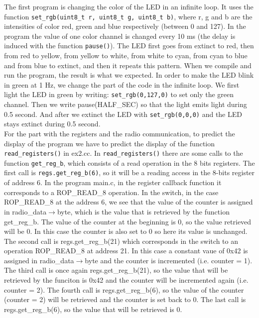 \documentclass[11pt]{article}
\begin{document}
The first program is changing the color of the LED in an infinite loop. It uses the function \texttt{set\_rgb(uint8\_t r, uint8\_t g, uint8\_t b)}, where r, g and b are the intensities of color red, green and blue respectively (between 0 and 127). In the program the value of one color channel is changed every 10 ms (the delay is induced with the function \texttt{pause()}). The LED first goes from extinct to red, then from red to yellow, from yellow to white, from white to cyan, from cyan to blue and from blue to extinct, and then it repeats this pattern. When we compile and run the program, the result is what we expected. In order to make the LED blink in green at 1 Hz, we change the part of the code in the infinite loop. We first light the LED in green by writing: \texttt{set\_rgb(0,127,0)} to set only the green channel. Then we write pause(HALF\_SEC) so that the light emits light during 0.5 second. And after we extinct the LED with \texttt{set\_rgb(0,0,0)} and the LED stays extinct during 0.5 second.
\\
For the part with the registers and the radio communication, to predict the display of the program we have to predict the display of the function \texttt{read\_registers()} in ex2.cc. In \texttt{read\_registers()} there are some calls to the function \texttt{get\_reg\_b}, which consists of a read operation in the 8 bits registers. The first call is \texttt{regs.get\_reg\_b(6)}, so it will be a reading access in the 8-bits register of address 6. In the program main.c, in the register callback function it corresponds to a ROP\_READ\_8 operation. In the switch, in the case ROP\_READ\_8 at the address 6, we see that the value of the counter is assigned in radio\_data${\rightarrow}$byte, which is the value that is retrieved by the function get\_reg\_b. The value of the counter at the beginning is 0, so the value retrieved will be 0. In this case the counter is also set to 0 so here its value is unchanged. The second call is regs.get\_reg\_b(21) which corresponds in the switch to an operation ROP\_READ\_8 at address 21. In this case a constant vaue of 0x42 is assigned in radio\_data${\rightarrow}$byte and the counter is incremented (i.e. counter = 1). The third call is once again regs.get\_reg\_b(21), so the value that will be retrieved by the funciton is 0x42 and the counter will be incremented again (i.e. counter = 2). The fourth call is regs.get\_reg\_b(6), so the value of the counter (counter = 2) will be retrieved and the counter is set back to 0. The last call is regs.get\_reg\_b(6), so the value that will be retrieved is 0.
\end{document}
